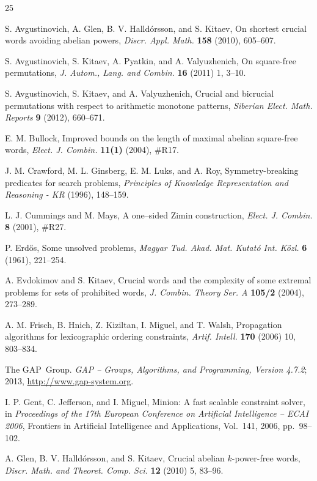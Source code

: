 \documentclass[12pt,reqno]{article}
\begin{document}
\begin{thebibliography}{25}
  
 S. Avgustinovich, A. Glen, B. V. Halld\'orsson, and S. Kitaev,
On shortest crucial words avoiding abelian powers, {\em Discr.
Appl. Math.} {\bf 158} (2010), 605--607.

 S. Avgustinovich, S. Kitaev, A. Pyatkin, and A.
Valyuzhenich, On square-free permutations, {\em J. Autom., Lang. and
Combin.} {\bf 16} (2011) 1, 3--10.

 S. Avgustinovich, S. Kitaev, and A. Valyuzhenich, Crucial
and bicrucial permutations with respect to arithmetic monotone
patterns, {\em Siberian Elect. Math. Reports} {\bf 9} (2012),
660--671.

 E. M. Bullock, Improved bounds on the length of maximal
abelian square-free words, {\em Elect. J. Combin.} {\bf 11(1)} (2004),
\#R17.

 J. M. Crawford, M. L. Ginsberg, E. M. Luks, and A.
Roy, Symmetry-breaking
  predicates for search problems, {\em Principles of Knowledge
  Representation and Reasoning - KR} (1996), 148--159.

 L. J. Cummings and M. Mays, A one--sided Zimin
construction, {\em Elect. J. Combin.} {\bf 8} (2001), \#R27.

 P. Erd\H{o}s, Some unsolved problems, {\em Magyar Tud. Akad. Mat. Kutat\'o Int. K\"ozl.}  {\bf 6} (1961), 221--254.

 A. Evdokimov and S. Kitaev, Crucial words and the
complexity of some extremal problems for sets of prohibited words,
{\em J. Combin. Theory Ser. A} {\bf 105/2}
(2004), 273--289. 

 A. M. Frisch, B. Hnich, Z. Kiziltan, I. Miguel, and T.
Walsh, Propagation
algorithms for lexicographic ordering constraints, {\em Artif.
Intell.}  {\bf 170} (2006) 10, 803--834.

  The GAP~Group. \emph{GAP -- Groups, Algorithms, and Programming, 
  Version 4.7.2}; 
  2013, \url{http://www.gap-system.org}.
    
I. P. Gent, C. Jefferson, and I. Miguel, Minion: A fast scalable
constraint solver, in {\em Proceedings of the 17th European Conference on Artificial Intelligence -- ECAI 2006}, Frontiers in Artificial Intelligence and
Applications, Vol.~141, 2006, pp.~98--102.


 A. Glen, B. V. Halld\'orsson, and S. Kitaev, Crucial
abelian $k$-power-free words, {\em Discr. Math. and Theoret. Comp.
Sci.} {\bf 12} (2010) 5, 83--96.


\end{thebibliography}
\end{document}
